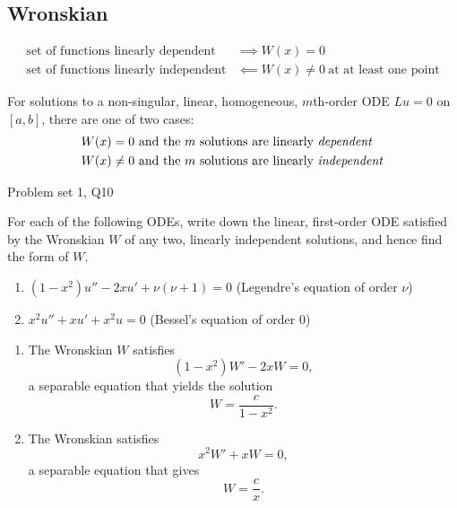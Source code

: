 \subsection{Wronskian}

    \begin{align*}
        \text{set of functions linearly dependent} &\implies W(x) = 0 \\
        \text{set of functions linearly independent} &\impliedby W(x) \neq 0 \ \text{at at least one point}
    \end{align*}

For solutions to a non-singular, linear, homogeneous, $m$th-order ODE $Lu = 0$ on $[a, b]$, there are one of two cases:
    \begin{align*}
        W(x) & = 0 \
            \text{and the $m$ solutions are linearly \textit{dependent}} \\
        W(x) &\neq 0 \
            \text{and the $m$ solutions are linearly \textit{independent}}
    \end{align*}

\begin{problem}{Problem set 1, Q10}{}


    For each of the following ODEs, write down the linear, first-order ODE satisfied by the Wronskian $W$ of any two, linearly independent solutions, and hence find the form of $W$.

    \begin{enumerate}
        \item $(1 - x^2) u'' - 2 x u' + \nu (\nu + 1) = 0$ \quad (Legendre's equation of order $\nu$)
        \item $x^2 u'' + xu' + x^2 u = 0$ \quad (Bessel's equation of order $0$)
    \end{enumerate}

    \tcblower

    \begin{enumerate}
        \item The Wronskian $W$ satisfies
            $$ (1 - x^2)W' - 2xW = 0 , $$
        a separable equation that yields the solution
            $$ W = \frac{c}{1 - x^2} . $$
        \item The Wronskian satisfies
            $$ x^2 W' + xW = 0 , $$
        a separable equation that gives
            $$ W = \frac{c}{x} . $$
    \end{enumerate}

\end{problem}

